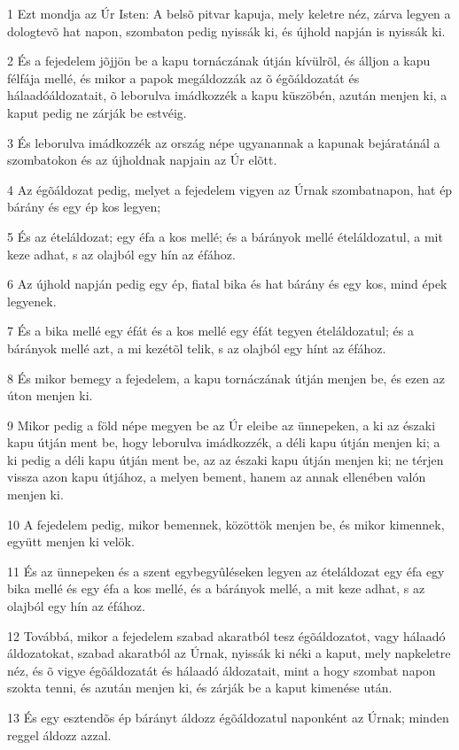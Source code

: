 \par 1 Ezt mondja az Úr Isten: A belsõ pitvar kapuja, mely keletre néz, zárva legyen a dologtevõ hat napon, szombaton pedig nyissák ki, és újhold napján is nyissák ki.
\par 2 És a fejedelem jõjjön be a kapu tornáczának útján kívülrõl, és álljon a kapu félfája mellé, és mikor a papok megáldozzák az õ égõáldozatát és hálaadóáldozatait, õ leborulva imádkozzék a kapu küszöbén, azután menjen ki, a kaput pedig ne zárják be estvéig.
\par 3 És leborulva imádkozzék az ország népe ugyanannak a kapunak bejáratánál a szombatokon és az újholdnak napjain az Úr elõtt.
\par 4 Az égõáldozat pedig, melyet a fejedelem vigyen az Úrnak szombatnapon, hat ép bárány és egy ép kos legyen;
\par 5 És az ételáldozat; egy éfa a kos mellé; és a bárányok mellé ételáldozatul, a mit keze adhat, s az olajból egy hín az éfához.
\par 6 Az újhold napján pedig egy ép, fiatal bika és hat bárány és egy kos, mind épek legyenek.
\par 7 És a bika mellé egy éfát és a kos mellé egy éfát tegyen ételáldozatul; és a bárányok mellé azt, a mi kezétõl telik, s az olajból egy hínt az éfához.
\par 8 És mikor bemegy a fejedelem, a kapu tornáczának útján menjen be, és ezen az úton menjen ki.
\par 9 Mikor pedig a föld népe megyen be az Úr eleibe az ünnepeken, a ki az északi kapu útján ment be, hogy leborulva imádkozzék, a déli kapu útján menjen ki; a ki pedig a déli kapu útján ment be, az az északi kapu útján menjen ki; ne térjen vissza azon kapu útjához, a melyen bement, hanem az annak ellenében valón menjen ki.
\par 10 A fejedelem pedig, mikor bemennek, közöttök menjen be, és mikor kimennek, együtt menjen ki velök.
\par 11 És az ünnepeken és a szent egybegyûléseken legyen az ételáldozat egy éfa egy bika mellé és egy éfa a kos mellé, és a bárányok mellé, a mit keze adhat, s az olajból egy hín az éfához.
\par 12 Továbbá, mikor a fejedelem szabad akaratból tesz égõáldozatot, vagy hálaadó áldozatokat, szabad akaratból az Úrnak, nyissák ki néki a kaput, mely napkeletre néz, és õ vigye égõáldozatát és hálaadó áldozatait, mint a hogy  szombat napon szokta tenni, és azután menjen ki, és zárják be a kaput kimenése után.
\par 13 És egy esztendõs ép bárányt áldozz égõáldozatul naponként az Úrnak; minden reggel áldozz azzal.
